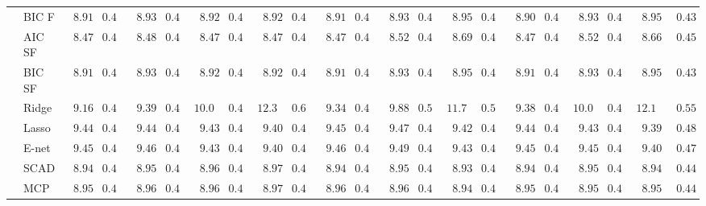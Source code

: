\begin{tabular}{p{0.2cm}p{1cm}|p{0.6cm}p{0.6cm}|p{0.6cm}p{0.6cm}p{0.6cm}p{0.6cm}p{0.6cm}p{0.6cm}|p{0.6cm}p{0.6cm}p{0.6cm}p{0.6cm}p{0.6cm}p{0.6cm}|p{0.6cm}p{0.6cm}p{0.6cm}p{0.6cm}p{0.6cm}p{0.6cm}}
 & BIC F  & $\phantom{0}8.91$ & $0.45$ & $\phantom{0}8.93$ & $0.44$ & $\phantom{0}8.92$ & $0.44$ & $\phantom{0}8.92$ & $0.43$ & $\phantom{0}8.91$ & $0.45$ & $\phantom{0}8.93$ & $0.44$ & $\phantom{0}8.95$ & $0.43$ & $\phantom{0}8.90$ & $0.43$ & $\phantom{0}8.93$ & $0.44$ & $\phantom{0}8.95$ & $\phantom{0}0.43$ \\
 & AIC SF  & $\phantom{0}8.47$ & $0.43$ & $\phantom{0}8.48$ & $0.42$ & $\phantom{0}8.47$ & $0.43$ & $\phantom{0}8.47$ & $0.44$ & $\phantom{0}8.47$ & $0.44$ & $\phantom{0}8.52$ & $0.45$ & $\phantom{0}8.69$ & $0.47$ & $\phantom{0}8.47$ & $0.43$ & $\phantom{0}8.52$ & $0.43$ & $\phantom{0}8.66$ & $\phantom{0}0.45$ \\
 & BIC SF  & $\phantom{0}8.91$ & $0.45$ & $\phantom{0}8.93$ & $0.44$ & $\phantom{0}8.92$ & $0.44$ & $\phantom{0}8.92$ & $0.43$ & $\phantom{0}8.91$ & $0.45$ & $\phantom{0}8.93$ & $0.44$ & $\phantom{0}8.95$ & $0.43$ & $\phantom{0}8.91$ & $0.43$ & $\phantom{0}8.93$ & $0.44$ & $\phantom{0}8.95$ & $\phantom{0}0.43$ \\
 & Ridge  & $\phantom{0}9.16$ & $0.48$ & $\phantom{0}9.39$ & $0.46$ & $10.09$ & $0.44$ & $12.30$ & $0.62$ & $\phantom{0}9.34$ & $0.47$ & $\phantom{0}9.88$ & $0.51$ & $11.73$ & $0.55$ & $\phantom{0}9.38$ & $0.44$ & $10.03$ & $0.48$ & $12.16$ & $\phantom{0}0.55$ \\
 & Lasso  & $\phantom{0}9.44$ & $0.47$ & $\phantom{0}9.44$ & $0.47$ & $\phantom{0}9.43$ & $0.48$ & $\phantom{0}9.40$ & $0.48$ & $\phantom{0}9.45$ & $0.48$ & $\phantom{0}9.47$ & $0.48$ & $\phantom{0}9.42$ & $0.49$ & $\phantom{0}9.44$ & $0.48$ & $\phantom{0}9.43$ & $0.48$ & $\phantom{0}9.39$ & $\phantom{0}0.48$ \\
 & E-net  & $\phantom{0}9.45$ & $0.48$ & $\phantom{0}9.46$ & $0.47$ & $\phantom{0}9.43$ & $0.48$ & $\phantom{0}9.40$ & $0.48$ & $\phantom{0}9.46$ & $0.49$ & $\phantom{0}9.49$ & $0.48$ & $\phantom{0}9.43$ & $0.49$ & $\phantom{0}9.45$ & $0.48$ & $\phantom{0}9.45$ & $0.48$ & $\phantom{0}9.40$ & $\phantom{0}0.47$ \\
 & SCAD  & $\phantom{0}8.94$ & $0.45$ & $\phantom{0}8.95$ & $0.44$ & $\phantom{0}8.96$ & $0.44$ & $\phantom{0}8.97$ & $0.43$ & $\phantom{0}8.94$ & $0.45$ & $\phantom{0}8.95$ & $0.43$ & $\phantom{0}8.93$ & $0.43$ & $\phantom{0}8.94$ & $0.44$ & $\phantom{0}8.95$ & $0.44$ & $\phantom{0}8.94$ & $\phantom{0}0.44$ \\
 & MCP  & $\phantom{0}8.95$ & $0.44$ & $\phantom{0}8.96$ & $0.44$ & $\phantom{0}8.96$ & $0.44$ & $\phantom{0}8.97$ & $0.43$ & $\phantom{0}8.96$ & $0.44$ & $\phantom{0}8.96$ & $0.43$ & $\phantom{0}8.94$ & $0.43$ & $\phantom{0}8.95$ & $0.45$ & $\phantom{0}8.95$ & $0.44$ & $\phantom{0}8.95$ & $\phantom{0}0.44$ \\

\end{tabular}
